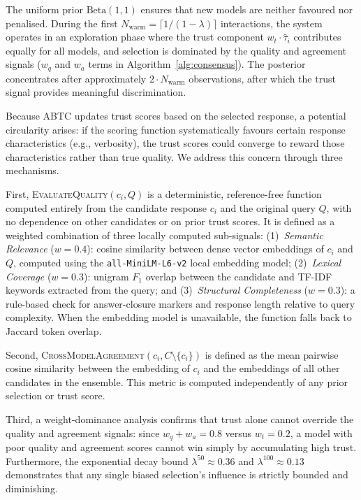 \documentclass{iopjournal}
\begin{document}
The uniform prior $\text{Beta}(1,1)$ ensures that new models are neither favoured nor penalised. During the first $N_{\text{warm}} = \lceil 1/(1-\lambda) \rceil$ interactions, the system operates in an exploration phase where the trust component $w_t \cdot \hat{\tau}_i$ contributes equally for all models, and selection is dominated by the quality and agreement signals ($w_q$ and $w_a$ terms in Algorithm~\ref{alg:consensus}). The posterior concentrates after approximately $2 \cdot N_{\text{warm}}$ observations, after which the trust signal provides meaningful discrimination.

Because ABTC updates trust scores based on the selected response, a potential circularity arises: if the scoring function systematically favours certain response characteristics (e.g., verbosity), the trust scores could converge to reward those characteristics rather than true quality. We address this concern through three mechanisms.

First, \textsc{EvaluateQuality}$(c_i, Q)$ is a deterministic, reference-free function computed entirely from the candidate response $c_i$ and the original query $Q$, with no dependence on other candidates or on prior trust scores. It is defined as a weighted combination of three locally computed sub-signals: (1)~\emph{Semantic Relevance} ($w=0.4$): cosine similarity between dense vector embeddings of $c_i$ and $Q$, computed using the \texttt{all-MiniLM-L6-v2} local embedding model; (2)~\emph{Lexical Coverage} ($w=0.3$): unigram $F_1$ overlap between the candidate and TF-IDF keywords extracted from the query; and (3)~\emph{Structural Completeness} ($w=0.3$): a rule-based check for answer-closure markers and response length relative to query complexity. When the embedding model is unavailable, the function falls back to Jaccard token overlap.

Second, \textsc{CrossModelAgreement}$(c_i, C \setminus \{c_i\})$ is defined as the mean pairwise cosine similarity between the embedding of $c_i$ and the embeddings of all other candidates in the ensemble. This metric is computed independently of any prior selection or trust score.

Third, a weight-dominance analysis confirms that trust alone cannot override the quality and agreement signals: since $w_q + w_a = 0.8$ versus $w_t = 0.2$, a model with poor quality and agreement scores cannot win simply by accumulating high trust. Furthermore, the exponential decay bound $\lambda^{50} \approx 0.36$ and $\lambda^{100} \approx 0.13$ demonstrates that any single biased selection's influence is strictly bounded and diminishing.
\end{document}
